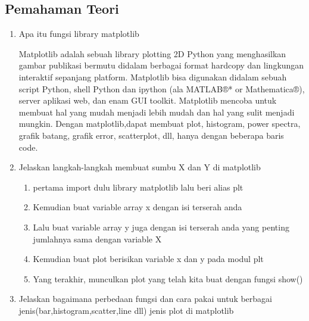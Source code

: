 \subsection{Pemahaman Teori}
\begin{enumerate}
\item Apa itu fungsi library matplotlib

	Matplotlib adalah sebuah library plotting 2D Python yang menghasilkan gambar publikasi bermutu didalam berbagai format hardcopy dan lingkungan interaktif sepanjang platform. Matplotlib bisa digunakan didalam sebuah script Python, shell Python dan ipython (ala MATLAB®* or Mathematica®), server aplikasi web, dan enam GUI toolkit. Matplotlib mencoba untuk membuat hal yang mudah menjadi lebih mudah dan hal yang sulit menjadi mungkin. Dengan matplotlib,dapat membuat plot, histogram, power spectra, grafik batang, grafik error, scatterplot, dll, hanya dengan beberapa baris code.

\item Jelaskan langkah-langkah membuat sumbu X dan Y di matplotlib
\begin{enumerate}
	\item pertama import dulu library matplotlib lalu beri alias plt
	

	\item Kemudian buat variable array x dengan isi terserah anda
	

	\item Lalu buat variable array y juga dengan isi terserah anda yang penting jumlahnya sama dengan variable X
	

	\item Kemudian buat plot berisikan variable x dan y pada modul plt
	

	\item Yang terakhir, munculkan plot yang telah kita buat dengan fungsi show()
	
\end{enumerate}

\item Jelaskan bagaimana perbedaan fungsi dan cara pakai untuk berbagai jenis(bar,histogram,scatter,line dll) jenis plot di matplotlib


\end{enumerate}
